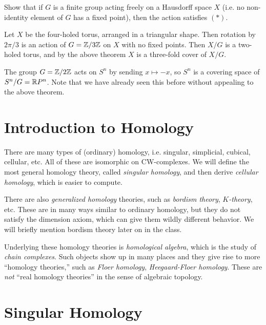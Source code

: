 \begin{exercise}
  Show that if $G$ is a finite group acting freely on a
  Hausdorff space $X$ (i.e. no non-identity element of $G$ has a
  fixed point), then the action satisfies $(*)$.
\end{exercise}

\begin{example}
  Let $X$ be the four-holed torus, arranged in a
  triangular shape. Then rotation by $2\pi / 3$
  is an action of $G = \mathbb{Z} / 3\mathbb{Z}$ on $X$ with no fixed
  points. Then $X / G$ is a two-holed torus, and
  by the above theorem
  $X$ is a three-fold cover of $X / G$.
\end{example}

\begin{example}
  The group $G = \mathbb{Z} / 2\mathbb{Z}$ acts on $S^n$ by sending
  $x \mapsto -x$, so $S^n$ is a covering space
  of $S^n / G = \mathbb{R} P^n$. Note that we have already
  seen this before without appealing to the above
  theorem.
\end{example}

\section{Introduction to Homology}

\begin{remark}
  There are many types of (ordinary) homology, i.e.
  singular, simplicial, cubical, cellular, etc.
  All of these are isomorphic on CW-complexes.
  We will define the most general homology theory,
  called \emph{singular homology}, and then derive
  \emph{cellular homology}, which is easier to compute.
  
  There are also \emph{generalized homology} theories,
  such as \emph{bordism theory}, \emph{$K$-theory}, etc.
  These are in many ways similar to ordinary homology,
  but they do not satisfy the dimension axiom, which
  can give them wildly different behavior. We will
  briefly mention bordism theory later on in the class.

  Underlying these homology theories is
  \emph{homological algebra}, which is the study of
  \emph{chain complexes}. Such objects show up in
  many places and they give rise to
  more ``homology theories,'' such as
  \emph{Floer homology}, \emph{Heegaard-Floer homology}.
  These are \emph{not} ``real homology theories''
  in the sense of algebraic topology.
\end{remark}

\section{Singular Homology}

